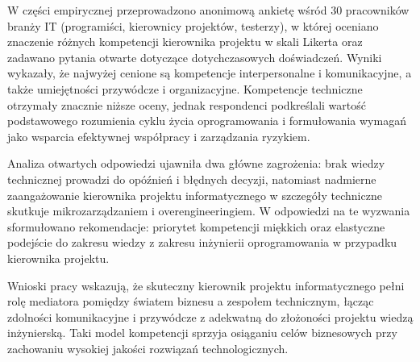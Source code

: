 \documentclass[
    left=2.5cm,         %
    right=2.5cm,        %
    top=2.5cm,          %
    bottom=3cm,         %
    bindingoffset=6mm,  %
    nohyphenation=false %
]{eiti/eiti-thesis}
\begin{document}
W części empirycznej przeprowadzono anonimową ankietę wśród 30 pracowników branży IT (programiści, kierownicy projektów, testerzy), w której oceniano znaczenie różnych kompetencji kierownika projektu w skali Likerta oraz zadawano pytania otwarte dotyczące dotychczasowych doświadczeń. Wyniki wykazały, że najwyżej cenione są kompetencje interpersonalne i komunikacyjne, a także umiejętności przywódcze i organizacyjne. Kompetencje techniczne otrzymały znacznie niższe oceny, jednak respondenci podkreślali wartość podstawowego rozumienia cyklu życia oprogramowania i formułowania wymagań jako wsparcia efektywnej współpracy i zarządzania ryzykiem.

Analiza otwartych odpowiedzi ujawniła dwa główne zagrożenia: brak wiedzy technicznej prowadzi do opóźnień i błędnych decyzji, natomiast nadmierne zaangażowanie kierownika projektu informatycznego w szczegóły techniczne skutkuje mikrozarządzaniem i overengineeringiem. W odpowiedzi na te wyzwania sformułowano rekomendacje: priorytet kompetencji miękkich oraz elastyczne podejście do zakresu wiedzy z zakresu inżynierii oprogramowania w przypadku kierownika projektu.

Wnioski pracy wskazują, że skuteczny kierownik projektu informatycznego pełni rolę mediatora pomiędzy światem biznesu a zespołem technicznym, łącząc zdolności komunikacyjne i przywódcze z adekwatną do złożoności projektu wiedzą inżynierską. Taki model kompetencji sprzyja osiąganiu celów biznesowych przy zachowaniu wysokiej jakości rozwiązań technologicznych.

\end{document}
